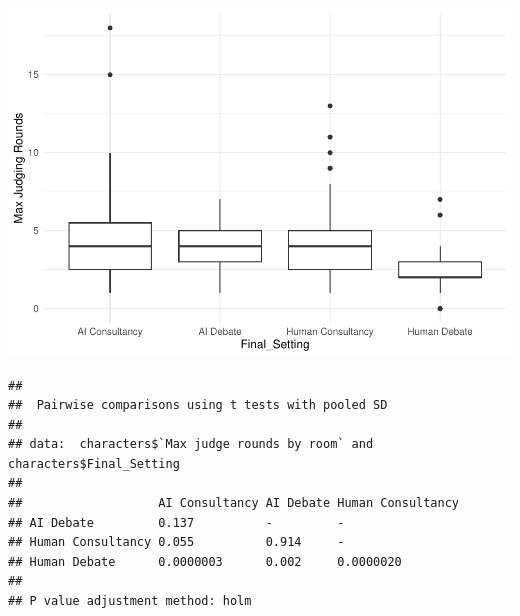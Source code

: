 \documentclass[
]{article}
\newenvironment{Shaded}{\begin{snugshade}}{\end{snugshade}}
\newcommand{\AttributeTok}[1]{\textcolor[rgb]{0.13,0.29,0.53}{#1}}
\newcommand{\FunctionTok}[1]{\textcolor[rgb]{0.13,0.29,0.53}{\textbf{#1}}}
\newcommand{\NormalTok}[1]{#1}
\newcommand{\SpecialCharTok}[1]{\textcolor[rgb]{0.81,0.36,0.00}{\textbf{#1}}}
\newcommand{\StringTok}[1]{\textcolor[rgb]{0.31,0.60,0.02}{#1}}
\begin{document}
\includegraphics[width=1\linewidth]{debate-2309_files/figure-latex/rounds graph-1}

\begin{Shaded}
\end{Shaded}

\begin{verbatim}
## 
##  Pairwise comparisons using t tests with pooled SD 
## 
## data:  characters$`Max judge rounds by room` and characters$Final_Setting 
## 
##                   AI Consultancy AI Debate Human Consultancy
## AI Debate         0.137          -         -                
## Human Consultancy 0.055          0.914     -                
## Human Debate      0.0000003      0.002     0.0000020        
## 
## P value adjustment method: holm
\end{verbatim}
\end{document}
